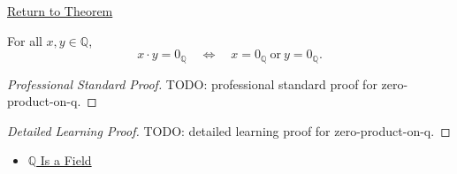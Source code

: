 \newpage
{}
\label{prf:zero-product-on-q}

\begin{remark*}[Return]
\hyperref[cor:zero-product-on-q]{Return to Theorem}
\end{remark*}

\begin{corollary*}
For all $x,y\in\mathbb{Q}$,
\[
x\cdot y=0_{\mathbb{Q}}
\quad\Longleftrightarrow\quad
x=0_{\mathbb{Q}}\ \text{or}\ y=0_{\mathbb{Q}}.
\]
\end{corollary*}

\begin{proof}[Professional Standard Proof]
\LRAProofBodyStart
TODO: professional standard proof for zero-product-on-q.
\end{proof}

\begin{proof}[Detailed Learning Proof]
\LRAProofBodyStart
TODO: detailed learning proof for zero-product-on-q.
\end{proof}

\begin{remark*}
\end{remark*}

\begin{dependencies}
\begin{itemize}
  \item \hyperref[thm:q-is-a-field]{$\mathbb{Q}$ Is a Field}
\end{itemize}
\end{dependencies}

\clearpage
